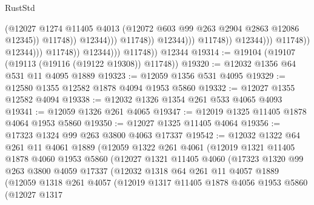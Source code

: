 \begin{lexlean}{RustStd}
\begin{coremodule}
{\begin{coremodule}
{{{{{{{{{{{{{{{{{{{{{{{{{{{{{                                                          (@12027
                                                            @1274
                                                            @11405
                                                            @4013
                                                            (@12072
                                                              @603
                                                              @99
                                                              @263
                                                              @2904
                                                              @2863
                                                              @12086
                                                              @12345))
                                                          @11748))
                                                      @12344)))
                                                @11748))
                                            @12344)))
                                      @11748))
                                  @12344)))
                            @11748))
                        @12344)))
                  @11748))
              @12344)))
        @11748))
    @12344
@19314 := @19104 (@19107 (@19113 (@19116 (@19122 @19308)) @11748))
@19320 := @12032 @1356 @64 @531 @11 @4095 @1889
@19323 := @12059 @1356 @531 @4095
@19329 := @12580 @1355 @12582 @1878 @4094 @1953 @5860
@19332 := @12027 @1355 @12582 @4094
@19338 := @12032 @1326 @1354 @261 @533 @4065 @4093
@19341 := @12059 @1326 @261 @4065
@19347 := @12019 @1325 @11405 @1878 @4064 @1953 @5860
@19350 := @12027 @1325 @11405 @4064
@19356 := @17323 @1324 @99 @263 @3800 @4063 @17337
@19542 := @12032
    @1322
    @64
    @261
    @11
    @4061
    @1889
    (@12059
      @1322
      @261
      @4061
      (@12019
        @1321
        @11405
        @1878
        @4060
        @1953
        @5860
        (@12027
          @1321
          @11405
          @4060
          (@17323
            @1320
            @99
            @263
            @3800
            @4059
            @17337
            (@12032
              @1318
              @64
              @261
              @11
              @4057
              @1889
              (@12059
                @1318
                @261
                @4057
                (@12019
                  @1317
                  @11405
                  @1878
                  @4056
                  @1953
                  @5860
                  (@12027
                    @1317
}}}}}}}}}}}}}}}}}}}}}}}}}}}}}
\end{coremodule}}
\end{coremodule}
\end{lexlean}
